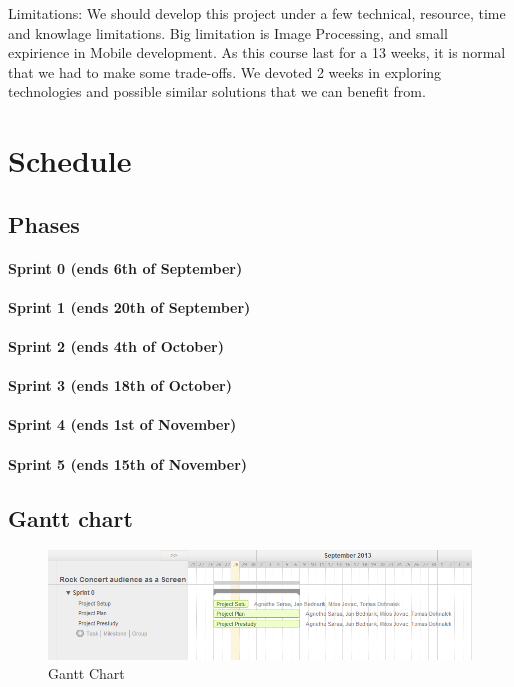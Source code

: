 \documentclass{article}
\begin{document}
 Limitations:
  We should develop this project under a few technical, resource, time and knowlage limitations. Big limitation is Image Processing, and small expirience in Mobile development.
  As this course last for a 13 weeks, it is normal that we had to make some trade-offs. We devoted 2 weeks in exploring technologies and possible similar solutions that we can benefit from.
  
  
\section{Schedule}
\subsection{Phases}
\paragraph{Sprint 0 (ends 6th of September)}
\paragraph{Sprint 1 (ends 20th of September)}
\paragraph{Sprint 2 (ends 4th of October)}
\paragraph{Sprint 3 (ends 18th of October)}
\paragraph{Sprint 4 (ends 1st of November)}
\paragraph{Sprint 5 (ends 15th of November)}
\subsection{Gantt chart}

\begin{figure}[ht]
\begin{center}
    \includegraphics[scale=0.6]{images/gantt}
    \caption{Gantt Chart}
    \label{img:gantt}
\end{center}
\end{figure}
\end{document}
